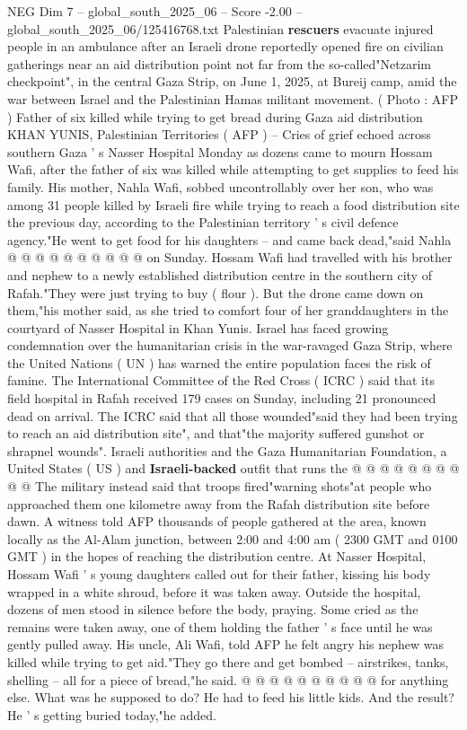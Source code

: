\begin{textsample}{NEG Dim 7 – global\_south\_2025\_06 – Score -2.00 – global\_south\_2025\_06/125416768.txt}  \label{ex:f7_neg_056}
Palestinian \textbf{rescuers} evacuate injured people in an ambulance after an Israeli drone reportedly opened fire on civilian gatherings near an aid distribution point not far from the so-called"Netzarim checkpoint", in the central Gaza Strip, on June 1, 2025, at Bureij camp, amid the war between Israel and the Palestinian Hamas militant movement. ( Photo : AFP ) Father of six killed while trying to get bread during Gaza aid distribution KHAN YUNIS, Palestinian Territories ( AFP ) -- Cries of grief echoed across southern Gaza ' s Nasser Hospital Monday as dozens came to mourn Hossam Wafi, after the father of six was killed while attempting to get supplies to feed his family.
His mother, Nahla Wafi, sobbed uncontrollably over her son, who was among 31 people killed by Israeli fire while trying to reach a food distribution site the previous day, according to the Palestinian territory ' s civil defence agency."He went to get food for his daughters -- and came back dead,"said Nahla @ @ @ @ @ @ @ @ @ @ on Sunday.
Hossam Wafi had travelled with his brother and nephew to a newly established distribution centre in the southern city of Rafah."They were just trying to buy ( flour ).
But the drone came down on them,"his mother said, as she tried to comfort four of her granddaughters in the courtyard of Nasser Hospital in Khan Yunis.
Israel has faced growing condemnation over the humanitarian crisis in the war-ravaged Gaza Strip, where the United Nations ( UN ) has warned the entire population faces the risk of famine.
The International Committee of the Red Cross ( ICRC ) said that its field hospital in Rafah received 179 cases on Sunday, including 21 pronounced dead on arrival.
The ICRC said that all those wounded"said they had been trying to reach an aid distribution site", and that"the majority suffered gunshot or shrapnel wounds".
Israeli authorities and the Gaza Humanitarian Foundation, a United States ( US ) and \textbf{Israeli-backed} outfit that runs the @ @ @ @ @ @ @ @ @ @ The military instead said that troops fired"warning shots"at people who approached them one kilometre away from the Rafah distribution site before dawn.
A witness told AFP thousands of people gathered at the area, known locally as the Al-Alam junction, between 2:00 and 4:00 am ( 2300 GMT and 0100 GMT ) in the hopes of reaching the distribution centre.
At Nasser Hospital, Hossam Wafi ' s young daughters called out for their father, kissing his body wrapped in a white shroud, before it was taken away.
Outside the hospital, dozens of men stood in silence before the body, praying.
Some cried as the remains were taken away, one of them holding the father ' s face until he was gently pulled away.
His uncle, Ali Wafi, told AFP he felt angry his nephew was killed while trying to get aid."They go there and get bombed -- airstrikes, tanks, shelling -- all for a piece of bread,"he said. @ @ @ @ @ @ @ @ @ @ for anything else.
What was he supposed to do?
He had to feed his little kids.
And the result?
He ' s getting buried today,"he added.

\end{textsample}
